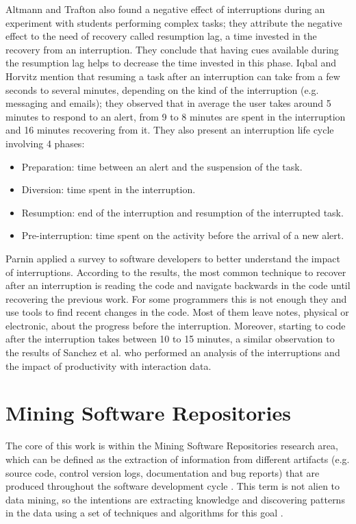 Altmann and Trafton \cite{AT04} also found a negative effect of interruptions during an experiment with students performing complex tasks; they attribute the negative effect to the need of recovery called resumption lag, a time invested in the recovery from an interruption. They conclude that having cues available during the resumption lag helps to decrease the time invested in this phase. Iqbal and Horvitz \cite{IH07} mention that resuming a task after an interruption can take from a few seconds to several minutes, depending on the kind of the interruption (e.g. messaging and emails); they observed that in average the user takes around 5 minutes to respond to an alert, from 9 to 8 minutes are spent in the interruption and 16 minutes recovering from it. They also present an interruption life cycle involving 4 phases: 
\begin{itemize}
	\item Preparation: time between an alert and the suspension of the task.
	\item Diversion: time spent in the interruption.
	\item Resumption: end of the interruption and resumption of the interrupted task.
	\item Pre-interruption: time spent on the activity before the arrival of a new alert.
\end{itemize}
Parnin \cite{PD10} applied a survey to software developers to better understand the impact of interruptions. According to the results, the most common technique to recover after an interruption is reading the code and navigate backwards in the code until recovering the previous work. For some programmers this is not enough they and use tools to find recent changes in the code. Most of them leave notes, physical or electronic, about the progress before the interruption. Moreover, starting to code after the interruption takes between 10 to 15 minutes, a similar observation to the results of Sanchez et al. \cite{SRV15} who performed an analysis of the interruptions and the impact of productivity with interaction data.


\section{Mining Software Repositories}
The core of this work is within the Mining Software Repositories research area, which can be defined as the extraction of information from different artifacts (e.g. source code, control version logs, documentation and bug reports) that are produced throughout the software development cycle \cite{H04}. This term is not alien to data mining, so the intentions are extracting knowledge and discovering patterns in the data using a set of techniques and algorithms for this goal \cite{FPG96}.

